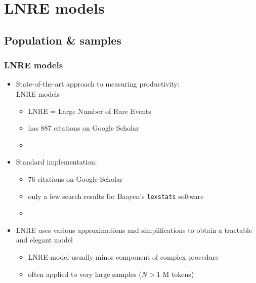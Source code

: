 \documentclass[t]{beamer} %
\begin{document}
\section{LNRE models}
\subsection{Population \& samples}

\begin{frame}
  \frametitle{LNRE models}

  \begin{itemize}
  \item State-of-the-art approach to measuring productivity:\\
    \h{LNRE models} \citep{Baayen:01}
    \begin{itemize}
    \item LNRE = Large Number of Rare Events
    \item \citet{Baayen:01} has 887 citations on Google Scholar
    \item[]
    \end{itemize}
  \item Standard implementation:  \citep{Evert:Baroni:07}
    \begin{itemize}
    \item 76 citations on Google Scholar
    \item only a few search results for Baayen's \texttt{lexstats} software
    \item[]
    \end{itemize}
  \item LNRE uses various approximations and simplifications to obtain a tractable and elegant model
    \begin{itemize}
    \item LNRE model usually minor component of complex procedure
    \item often applied to very large samples ($N > 1$ M tokens)
    \end{itemize}
  \end{itemize}
\end{frame}
\end{document}
